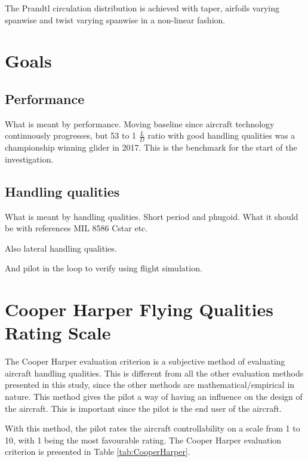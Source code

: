 \documentclass{report}
\begin{document}
The Prandtl circulation distribution is achieved with taper, airfoils varying spanwise and twist varying spanwise in a non-linear fashion.


\section{Goals}

\subsection{Performance}

What is meant by performance. Moving baseline since aircraft technology continuously progresses, but 53 to 1 $\frac{L}{D}$ ratio with good handling qualities was a championship winning glider in 2017.  This is the benchmark for the start of the investigation.

\subsection{Handling qualities}

What is meant by handling qualities. Short period and phugoid. What it should be with references
MIL 8586
Cstar etc.

Also lateral handling qualities.

And pilot in the loop to verify using flight simulation.


\section{Cooper Harper Flying Qualities Rating Scale}\label{Sec:  CooperHarperMethodExplain}


The Cooper Harper evaluation criterion \citep{CooperHarper} is a subjective method of evaluating aircraft handling qualities.  This is different from all the other evaluation methods presented in this study, since the other methods are mathematical/empirical in nature.  This method gives the pilot a way of having an influence on the design of the aircraft.  This is important since the pilot is the end user of the aircraft.

With this method, the pilot rates the aircraft controllability on a scale from 1 to 10, with 1 being the most favourable rating.  The Cooper Harper evaluation criterion is presented in Table \ref{tab:CooperHarper}.  
\end{document}
